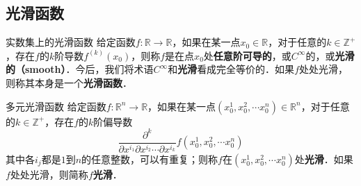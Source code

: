 
\subsection{光滑函数}

\begin{definition}{实数集上的光滑函数}
给定函数$f:\mathbb{R}\rightarrow\mathbb{R}$，如果在某一点$x_0\in\mathbb{R}$，对于任意的$k\in\mathbb{Z}^+$，存在$f$的$k$阶导数$f^{(k)}(x_0)$，则称$f$是在点$x_0$处\textbf{任意阶可导的}，或$C^\infty$的，或\textbf{光滑的（smooth）}．今后，我们将术语$C^{\infty}$和\textbf{光滑}看成完全等价的．如果$f$处处光滑，则称其本身是一个\textbf{光滑函数}．
\end{definition}

\begin{definition}{多元光滑函数}
给定函数$f:\mathbb{R}^n\rightarrow\mathbb{R}$，如果在某一点$(x_0^1, x_0^2, \cdots x_0^n) \in\mathbb{R}^n$，对于任意的$k\in\mathbb{Z}^+$，存在$f$的$k$阶偏导数$$\frac{\partial^k}{\partial x^{i_1}\partial x^{i_2}\cdots\partial x^{i_k}}f(x_0^1, x_0^2, \cdots x_0^n)$$其中各$i_j$都是$1$到$n$的任意整数，可以有重复；则称$f$在$(x_0^1, x_0^2, \cdots x_0^n)$处\textbf{光滑}．如果$f$处处光滑，则简称$f$\textbf{光滑}．
\end{definition}



